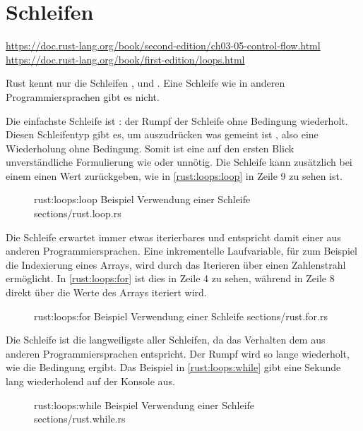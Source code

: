 \section{Schleifen}

\url{https://doc.rust-lang.org/book/second-edition/ch03-05-control-flow.html}
\url{https://doc.rust-lang.org/book/first-edition/loops.html}

Rust kennt nur die Schleifen ,  und .
Eine  Schleife wie in anderen Programmiersprachen gibt es nicht.


Die einfachste Schleife ist : der Rumpf der Schleife ohne Bedingung wiederholt.
Diesen Schleifentyp gibt es, um auszudrücken was gemeint ist , also eine Wiederholung ohne Bedingung.
Somit ist eine auf den ersten Blick unverständliche Formulierung wie  oder  unnötig.
Die  Schleife kann zusätzlich bei einem  einen Wert zurückgeben, wie in \autoref{rust:loops:loop} in Zeile 9 zu sehen ist.


\begin{figure}[H]
	\rustcinclude
		{rust:loops:loop}
		{Beispiel Verwendung einer  Schleife}
		{sections/rust.loop.rs}
\end{figure}


Die  Schleife erwartet immer etwas iterierbares und entspricht damit einer  aus anderen Programmiersprachen.
Eine inkrementelle Laufvariable, für zum Beispiel die Indexierung eines Arrays, wird durch das Iterieren über einen Zahlenstrahl ermöglicht.
In \autoref{rust:loops:for} ist dies in Zeile 4 zu sehen, während in Zeile 8 direkt über die Werte des Arrays iteriert wird.

\begin{figure}[H]
	\rustcinclude
		{rust:loops:for}
		{Beispiel Verwendung einer  Schleife}
		{sections/rust.for.rs}
\end{figure}


Die  Schleife ist die langweiligste aller Schleifen, da das Verhalten dem aus anderen Programmiersprachen entspricht.
Der Rumpf wird so lange wiederholt, wie die Bedingung  ergibt.
Das Beispiel in \autoref{rust:loops:while} gibt eine Sekunde lang wiederholend  auf der Konsole aus.


\begin{figure}[H]
	\rustcinclude
		{rust:loops:while}
		{Beispiel Verwendung einer  Schleife}
		{sections/rust.while.rs}
\end{figure}

